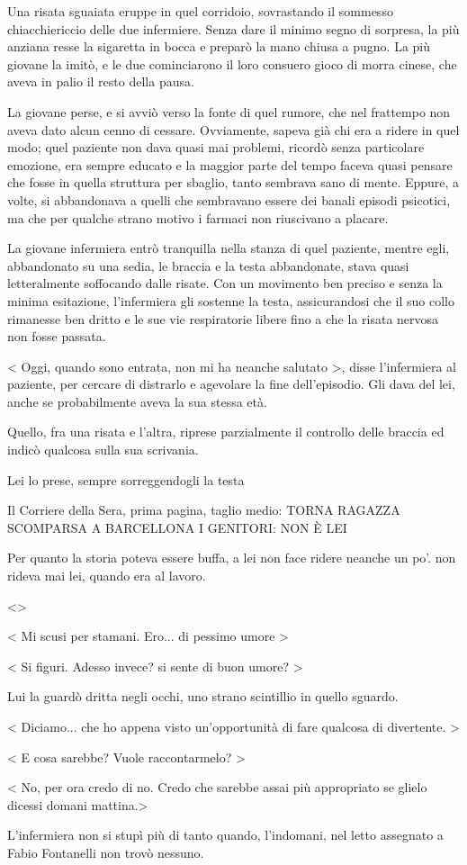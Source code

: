 Una risata sguaiata eruppe in quel corridoio, sovrastando il sommesso chiacchiericcio delle due infermiere. Senza dare il minimo segno di sorpresa, la più anziana resse la sigaretta in bocca e preparò la mano chiusa a pugno. La più giovane la imitò, e le due cominciarono il loro consuero gioco di morra cinese, che aveva in palio il resto della pausa.

La giovane perse, e si avviò verso la fonte di quel rumore, che nel frattempo non aveva dato alcun cenno di cessare. Ovviamente, sapeva già chi era a ridere in quel modo; quel paziente non dava quasi mai problemi, ricordò senza particolare emozione, era sempre educato e la maggior parte del tempo faceva quasi pensare che fosse in quella struttura per sbaglio, tanto sembrava sano di mente. Eppure, a volte, si abbandonava a quelli che sembravano essere dei banali episodi psicotici, ma che per qualche strano motivo i farmaci non riuscivano a placare.

La giovane infermiera entrò tranquilla nella stanza di quel paziente, mentre egli, abbandonato su una sedia, le braccia e la testa abbandonate, stava quasi letteralmente soffocando dalle risate. Con un movimento ben preciso e senza la minima esitazione, l'infermiera gli sostenne la testa, assicurandosi che il suo collo rimanesse ben dritto e le sue vie respiratorie libere fino a che la risata nervosa non fosse passata.

< Oggi, quando sono entrata, non mi ha neanche salutato >, disse l'infermiera al paziente, per cercare di distrarlo e agevolare la fine dell'episodio. Gli dava del lei, anche se probabilmente aveva la sua stessa età.

Quello, fra una risata e l'altra, riprese parzialmente il controllo delle braccia ed indicò qualcosa sulla sua scrivania.

Lei lo prese, sempre sorreggendogli la testa

Il Corriere della Sera, prima pagina, taglio medio:
TORNA RAGAZZA SCOMPARSA A BARCELLONA
I GENITORI: NON È LEI

Per quanto la storia poteva essere buffa, a lei non face ridere neanche un po'. non rideva mai lei, quando era al lavoro.

<>

< Mi scusi per stamani. Ero... di pessimo umore >

< Si figuri. Adesso invece? si sente di buon umore? >

Lui la guardò dritta negli occhi, uno strano scintillio in quello sguardo.

< Diciamo... che ho appena visto un'opportunità di fare qualcosa di divertente. >

< E cosa sarebbe? Vuole raccontarmelo? >

< No, per ora credo di no. Credo che sarebbe assai più appropriato se glielo dicessi domani mattina.>

L'infermiera non si stupì più di tanto quando, l'indomani, nel letto assegnato a Fabio Fontanelli non trovò nessuno.

